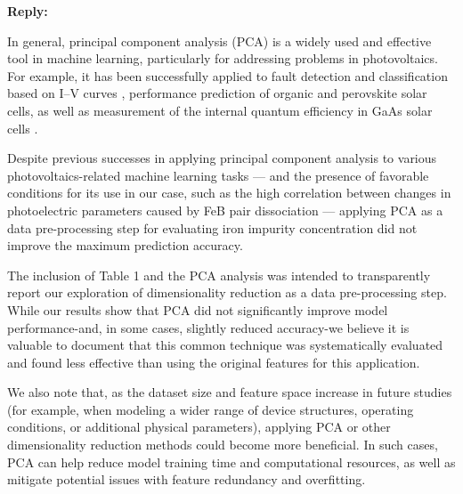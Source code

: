 \documentclass[a4paper,fleqn]{cas-sc}
\begin{document}
\noindent
\textcolor[rgb]{0.51,0.00,0.00}{\textbf{Reply:}}

In general, principal component analysis (PCA) is a widely used and effective tool in machine learning, 
particularly for addressing problems in photovoltaics. 
For example, it has been successfully applied to fault detection and classification based on I–V curves \cite{Fadhel2019, Gao2020}, 
performance prediction of organic \cite{David2021} and perovskite \cite{Liu2022} solar cells, 
as well as measurement of the internal quantum efficiency in GaAs solar cells \cite{AbdullahVetter2025}.

Despite previous successes in applying principal component analysis to various photovoltaics-related machine learning tasks ---
and the presence of favorable conditions for its use in our case, 
such as the high correlation between changes in photoelectric parameters caused by FeB pair dissociation --- 
applying PCA as a data pre-processing step for evaluating iron impurity concentration did not improve the maximum prediction accuracy.







The inclusion of Table 1 and the PCA analysis was intended to transparently report our exploration of dimensionality reduction as a data pre-processing step.
While our results show that PCA did not significantly improve model performance-and, in some cases, slightly reduced accuracy-we believe it is valuable to document that this common technique was systematically evaluated and found less effective than using the original features for this application.


We also note that, as the dataset size and feature space increase in future studies (for example, when modeling a wider range of device structures, operating conditions, or additional physical parameters), applying PCA or other dimensionality reduction methods could become more beneficial.
In such cases, PCA can help reduce model training time and computational resources, as well as mitigate potential issues with feature redundancy and overfitting.
\end{document}
